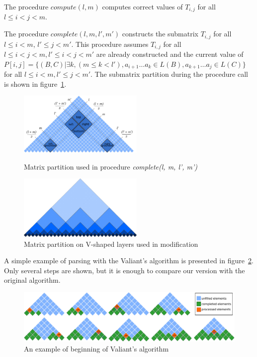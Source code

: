 The procedure $compute(l, m)$ computes correct values of $T_{i,j}$ for all $l \le i < j < m$.

The procedure $complete(l, m, l', m')$ constructs the submatrix $T_{i, j}$ for all $l \le i < m$, $l' \le j < m'$. This procedure assumes $T_{i, j}$ for all $l \leq i < j < m,  l' \leq i < j < m'$ are already constructed and the current value of  $P[i, j] =  \{ (B, C) |\exists k, (m \le k < l'), a_{i + 1} \dots a_{k} \in L(B), a_{k + 1} \dots a_{j} \in L(C)\}$ for all $l \leq i < m,  l' \leq j < m'$.
The submatrix partition during the procedure call is shown in figure~\ref{fig2}.


\begin{figure}
\vspace{3mm}
 \begin{center}
    \begin{minipage}{0.48\textwidth}
        \centering
        \includegraphics[width=6cm]{pictures/splitting_with_grounded.pdf}
        \caption{Matrix partition used in procedure \textit{complete(l, m, l', m')}}
        \label{fig1}
    \end{minipage}\hfill
    \begin{minipage}{0.48\textwidth}
        \centering
        \includegraphics[width=6cm]{pictures/layers.pdf}
        \caption{Matrix partition on V-shaped layers used in modification}
        \label{fig2}
    \end{minipage}
 \end{center}
\vspace{-8mm}
\end{figure}

A simple example of parsing with the Valiant's algorithm is presented in figure~\ref{fig3}.
Only several steps are shown, but it is enough to compare our version with the original algorithm.

\begin{figure}
\vspace{3mm}
 \begin{center}
 \includegraphics[width=12cm]{pictures/valbeg2.pdf}
    \caption{An example of beginning of Valiant's algorithm}
    \label{fig3}
\end{center}
\vspace{-8mm}
\end{figure}